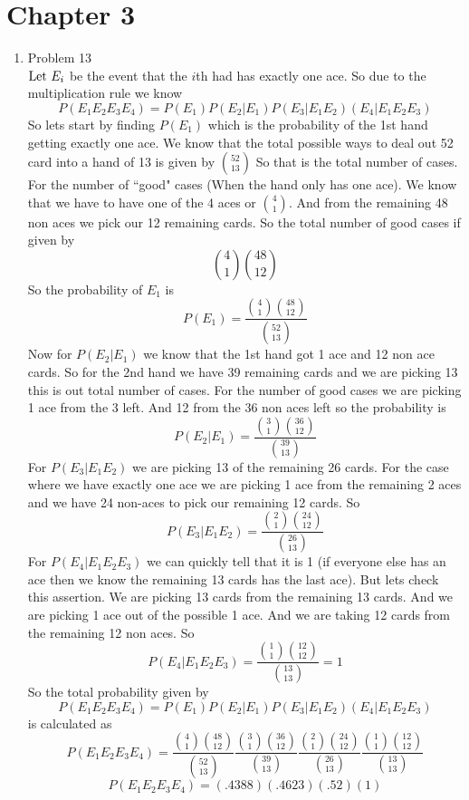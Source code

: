 \documentclass[11pt]{article}
\newcommand{\Let}{\textnormal{Let }}
\begin{document}

\section*{Chapter 3}
\begin{enumerate}
\item Problem 13\\
$\Let E_i$ be the event that the $i$th had has exactly one ace.
So due to the multiplication rule we know
$$P(E_1E_2E_3E_4) = P(E_1)P(E_2|E_1)P(E_3|E_1E_2)(E_4|E_1E_2E_3)$$
So lets start by finding $P(E_1)$ which is the probability of the 1st hand getting exactly one ace. We know that the total possible ways to deal out 52 card into a hand of 13 is given by $52\choose13$
So that is the total number of cases. For the number of ``good" cases (When the hand only has one ace). We know that we have to have one of the 4 aces or $4\choose1$. And from the remaining 48 non aces we pick our 12 remaining cards. So the total number of good cases if given by
$${4\choose1}{48\choose12}$$
So the probability of $E_1$ is
$$P(E_1) = \frac{{4\choose1}{48\choose12}}{{52\choose13}}$$
Now for $P(E_2|E_1)$ we know that the 1st hand got 1 ace and 12 non ace cards. So for the 2nd hand we have 39 remaining cards and we are picking 13 this is out total number of cases. For the number of good cases we are picking 1 ace from the 3 left. And 12 from the 36 non aces left so the probability is
$$P(E_2|E_1) = \frac{{3\choose1}{36\choose12}}{{39\choose13}}$$
For $P(E_3|E_1E_2)$ we are picking 13 of the remaining 26 cards. For the case where we have exactly one ace we are picking 1 ace from the remaining 2 aces and we have 24 non-aces to pick our remaining 12 cards. So
$$P(E_3|E_1E_2) = \frac{{2\choose1}{24\choose12}}{{26\choose13}}$$
For $P(E_4|E_1E_2E_3)$ we can quickly tell that it is 1 (if everyone else has an ace then we know the remaining 13 cards has the last ace). But lets check this assertion. We are picking 13 cards from the remaining 13 cards. And we are picking 1 ace out of the possible 1 ace. And we are taking 12 cards from the remaining 12 non aces. So
$$P(E_4|E_1E_2E_3) = \frac{{1\choose1}{12\choose12}}{{13\choose13}} =1$$
So the total probability given by
$$P(E_1E_2E_3E_4) = P(E_1)P(E_2|E_1)P(E_3|E_1E_2)(E_4|E_1E_2E_3)$$
is calculated as
$$P(E_1E_2E_3E_4)= \frac{{4\choose1}{48\choose12}}{{52\choose13}}\frac{{3\choose1}{36\choose12}}{{39\choose13}}\frac{{2\choose1}{24\choose12}}{{26\choose13}}\frac{{1\choose1}{12\choose12}}{{13\choose13}}$$
$$P(E_1E_2E_3E_4)= (.4388)(.4623)(.52)(1)$$
\begin{center}
\end{center}


\end{enumerate}
\end{document}
